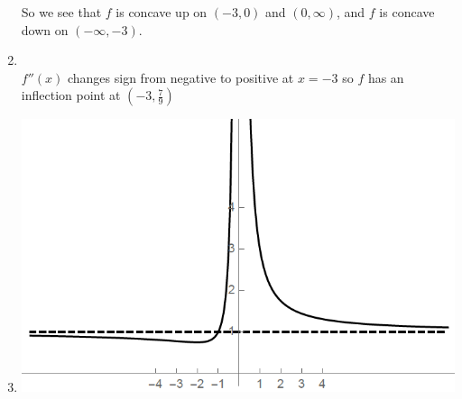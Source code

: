 \documentclass[nooutcomes,handout]{ximera}
\begin{document}
\begin{problem}
\begin{freeResponse}
\begin{enumerate}
       So we see that $f$ is concave up on $(-3,0)$ and $(0,\infty)$, and $f$ is concave down on $(-\infty, -3)$.
     \item
         \\
       $f''(x)$ changes sign from negative to positive at $x=-3$ so $f$ has an inflection point at $\left( -3, \frac{7}{9} \right)$
			
     \item
       \begin{image}
         \includegraphics[scale=.5]{Figure6.png}
       \end{image}

    \end{enumerate}
  \end{freeResponse}
\end{problem}
\end{document}
